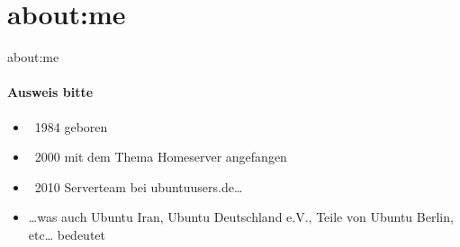 \section{about:me}

\begin{frame}{about:me}
\framesubtitle{Ausweis bitte}
\begin{itemize}
\item ~1984 geboren
\pause
\item ~2000 mit dem Thema Homeserver angefangen
\pause
\item ~2010 Serverteam bei ubuntuusers.de…
\pause
\item …was auch Ubuntu Iran, Ubuntu Deutschland e.V., Teile von Ubuntu Berlin, etc… bedeutet
\end{itemize}
\end{frame}
